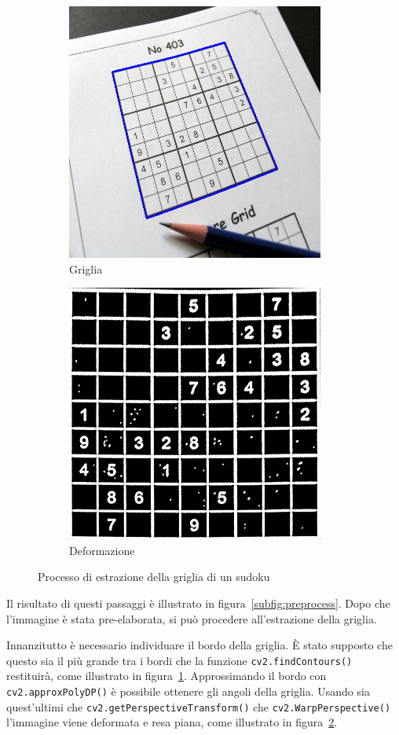 \documentclass[a4paper, 10pt]{article}
\begin{document}
\begin{figure}[ht]
\begin{subfigure}[b]{\subwidth\linewidth}
        \includegraphics[width=\imgwidth\linewidth]{imgs/grid.png}
        \caption{Griglia}\label{subfig:grid}
    \end{subfigure}%
    \begin{subfigure}[b]{\subwidth\linewidth}
        \centering
        \includegraphics[width=\imgwidth\linewidth]{imgs/warp.png}
        \caption{Deformazione}\label{subfig:warp}
    \end{subfigure}
    \caption{Processo di estrazione della griglia di un sudoku}\label{fig:extraction}
\end{figure}

Il risultato di questi passaggi è illustrato in figura~\ref{subfig:preprocess}.
Dopo che l'immagine è stata pre-elaborata, si può procedere all'estrazione
della griglia.

Innanzitutto è necessario individuare il bordo della griglia. È stato supposto
che questo sia il più grande tra i bordi che la funzione
\texttt{cv2.findContours()} restituirà, come illustrato in
figura~\ref{subfig:grid}.
Approssimando il bordo con \\ \texttt{cv2.approxPolyDP()} è possibile
ottenere gli angoli della griglia.
Usando sia quest'ultimi che \texttt{cv2.getPerspectiveTransform()} che \texttt{cv2.WarpPerspective()} l'immagine viene deformata e resa piana,
come illustrato in figura~\ref{subfig:warp}.
\end{document}
